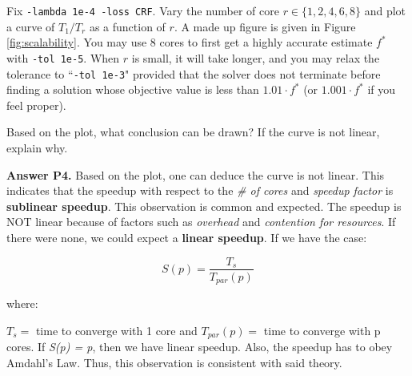 \documentclass[11pt]{report}
\begin{document}

%

Fix \verb!-lambda 1e-4 -loss CRF!.
Vary the number of core $r \in \{1, 2, 4, 6, 8\}$ and plot a curve of $T_1 / T_r$ as a function of $r$.
A made up figure is given in Figure \ref{fig:scalability}.
You may use 8 cores to first get a highly accurate estimate $f^*$ with \verb!-tol 1e-5!.
When $r$ is small, it will take longer, and you may relax the tolerance to ``\verb!-tol 1e-3!" provided that the solver does not terminate before finding a solution whose objective value is less than $1.01 \cdot f^*$ (or $1.001 \cdot f^*$ if you feel proper).

Based on the plot, what conclusion can be drawn?
If the curve is not linear, explain why.

{\bf Answer P4.} Based on the plot, one can deduce the curve is not linear. This indicates that the speedup with respect to the \textit{\# of cores} and \textit{speedup factor} is \textbf{sublinear speedup}. This observation is common and expected. The speedup is NOT linear because of factors such as \textit{overhead} and \textit{contention for resources}. If there were none, we could expect a \textbf{linear speedup}. If we have the case:

$$S(p) = \frac{T_{s}}{T_{par}(p)}$$

where:

$T_{s} = $ time to converge with 1 core and $T_{par}(p) = $ time to converge with p cores. If \textit{S(p) = p}, then we have linear speedup. Also, the speedup has to obey Amdahl's Law. Thus, this observation is consistent with said theory.
\end{document}
